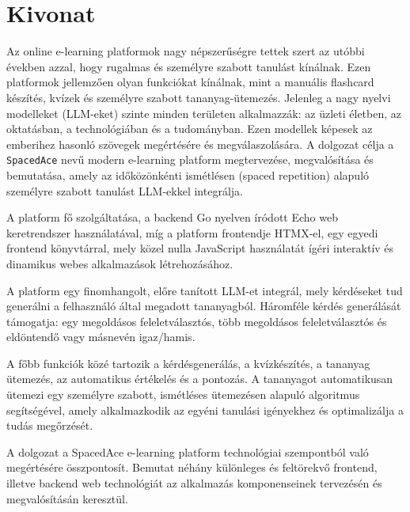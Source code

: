 \setcounter{page}{1}

\selecthungarian

\chapter*{Kivonat}

Az online e-learning platformok nagy népszerűségre tettek szert az utóbbi években azzal, hogy rugalmas és személyre szabott tanulást kínálnak. Ezen platformok jellemzően olyan funkciókat kínálnak, mint a manuális flashcard készítés, kvízek és személyre szabott tananyag-ütemezés. Jelenleg a nagy nyelvi modelleket (LLM-eket) szinte minden területen alkalmazzák: az üzleti életben, az oktatásban, a technológiában és a tudományban. Ezen modellek képesek az emberihez hasonló szövegek megértésére és megválaszolására. A dolgozat célja a \texttt{SpacedAce} nevű modern e-learning platform megtervezése, megvalósítása és bemutatása, amely az időközönkénti ismétlésen (spaced repetition) alapuló személyre szabott tanulást LLM-ekkel integrálja.

A platform fő szolgáltatása, a backend Go nyelven íródott Echo web keretrendszer használatával, míg a platform frontendje HTMX-el, egy egyedi frontend könyvtárral, mely közel nulla JavaScript használatát ígéri interaktív és dinamikus webes alkalmazások létrehozásához.

A platform egy finomhangolt, előre tanított LLM-et integrál, mely kérdéseket tud generálni a felhasználó által megadott tananyagból. Háromféle kérdés generálását támogatja: egy megoldásos feleletválasztós, több megoldásos feleletválasztós és eldöntendő vagy másnevén igaz/hamis.

A főbb funkciók közé tartozik a kérdésgenerálás, a kvízkészítés, a tananyag ütemezés, az automatikus értékelés és a pontozás. A tananyagot automatikusan ütemezi egy személyre szabott, ismétléses ütemezésen alapuló algoritmus segítségével, amely alkalmazkodik az egyéni tanulási igényekhez és optimalizálja a tudás megőrzését.

A dolgozat a SpacedAce e-learning platform technológiai szempontból való megértésére összpontosít. Bemutat néhány különleges és feltörekvő frontend, illetve backend web technológiát az alkalmazás komponenseinek tervezésén és megvalósításán keresztül.

